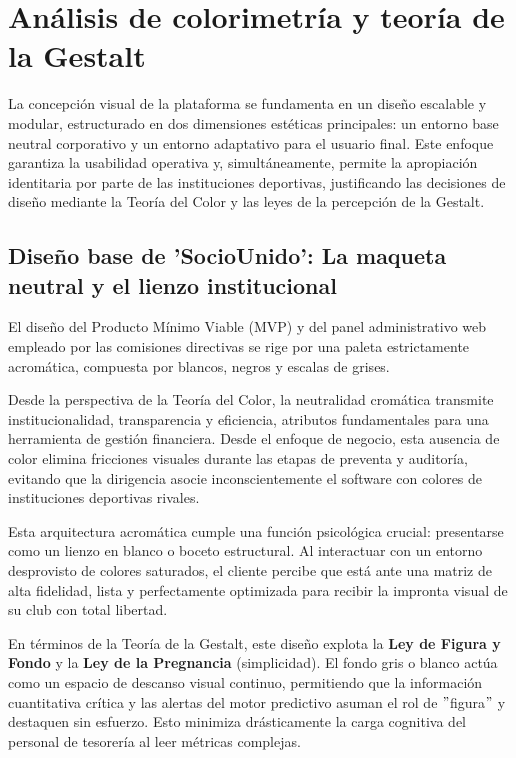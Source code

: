 \section{Análisis de colorimetría y teoría de la Gestalt}

La concepción visual de la plataforma se fundamenta en un diseño escalable y modular, estructurado en dos dimensiones estéticas principales: un entorno base neutral corporativo y un entorno adaptativo para el usuario final. Este enfoque garantiza la usabilidad operativa y, simultáneamente, permite la apropiación identitaria por parte de las instituciones deportivas, justificando las decisiones de diseño mediante la Teoría del Color y las leyes de la percepción de la Gestalt.

\subsection{Diseño base de 'SocioUnido': La maqueta neutral y el lienzo institucional}

El diseño del Producto Mínimo Viable (MVP) y del panel administrativo web empleado por las comisiones directivas se rige por una paleta estrictamente acromática, compuesta por blancos, negros y escalas de grises.

Desde la perspectiva de la Teoría del Color, la neutralidad cromática transmite institucionalidad, transparencia y eficiencia, atributos fundamentales para una herramienta de gestión financiera. Desde el enfoque de negocio, esta ausencia de color elimina fricciones visuales durante las etapas de preventa y auditoría, evitando que la dirigencia asocie inconscientemente el software con colores de instituciones deportivas rivales.

Esta arquitectura acromática cumple una función psicológica crucial: presentarse como un lienzo en blanco o boceto estructural. Al interactuar con un entorno desprovisto de colores saturados, el cliente percibe que está ante una matriz de alta fidelidad, lista y perfectamente optimizada para recibir la impronta visual de su club con total libertad.

En términos de la Teoría de la Gestalt, este diseño explota la \textbf{Ley de Figura y Fondo} y la \textbf{Ley de la Pregnancia} (simplicidad). El fondo gris o blanco actúa como un espacio de descanso visual continuo, permitiendo que la información cuantitativa crítica y las alertas del motor predictivo asuman el rol de $"$figura$"$ y destaquen sin esfuerzo. Esto minimiza drásticamente la carga cognitiva del personal de tesorería al leer métricas complejas.

